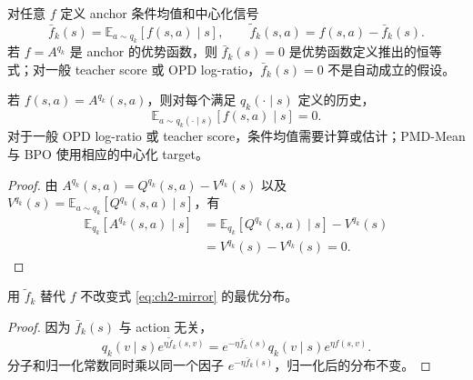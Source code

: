 \begin{definition}
\label{def:ch2-centered-signal}
对任意 $f$ 定义 anchor 条件均值和中心化信号
\begin{equation*}
\bar f_k(s)=\mathbb E_{a\sim q_k}[f(s,a)\mid s],
\qquad
\widetilde f_k(s,a)=f(s,a)-\bar f_k(s).
\end{equation*}
若 $f=A^{ q_k}$ 是 anchor 的优势函数，则 $\bar f_k(s)=0$ 是优势函数定义推出的恒等式；对一般 teacher score 或 OPD log-ratio，$\bar f_k(s)=0$ 不是自动成立的假设。
\end{definition}

\begin{proposition}
\label{prop:ch2-advantage-centering}
若 $f(s,a)=A^{ q_k}(s,a)$，则对每个满足 $ q_k(\cdot\mid s)$ 定义的历史，
\begin{equation}
\label{eq:ch2-advantage-zero-mean}
\mathbb E_{a\sim q_k(\cdot\mid s)}[f(s,a)\mid s]=0.
\end{equation}
对于一般 OPD log-ratio 或 teacher score，条件均值需要计算或估计；PMD-Mean 与 BPO 使用相应的中心化 target。
\end{proposition}

\begin{proof}
由 $A^{ q_k}(s,a)=Q^{ q_k}(s,a)-V^{ q_k}(s)$ 以及
$V^{ q_k}(s)=\mathbb E_{a\sim q_k}[Q^{ q_k}(s,a)\mid s]$，有
\begin{align*}
\mathbb E_{ q_k}[A^{ q_k}(s,a)\mid s]
&=\mathbb E_{ q_k}[Q^{ q_k}(s,a)\mid s]-V^{ q_k}(s)\\
&=V^{ q_k}(s)-V^{ q_k}(s)=0.
\end{align*}
\end{proof}

\begin{proposition}
\label{prop:ch2-centering}
用 $\widetilde f_k$ 替代 $f$ 不改变式 \eqref{eq:ch2-mirror} 的最优分布。
\end{proposition}

\begin{proof}
因为 $\bar f_k(s)$ 与 action 无关，
\begin{equation*}
 q_k(v\mid s)e^{\eta\widetilde f_k(s,v)}
=e^{-\eta\bar f_k(s)} q_k(v\mid s)e^{\eta f(s,v)}.
\end{equation*}
分子和归一化常数同时乘以同一个因子 $e^{-\eta\bar f_k(s)}$，归一化后的分布不变。
\end{proof}
